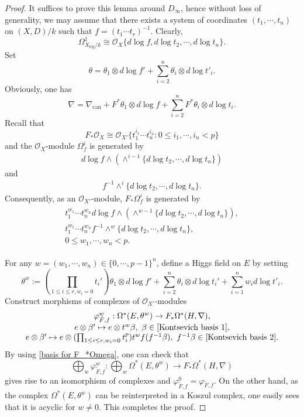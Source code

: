 \documentclass[12pt, a4paper]{article}
\begin{document}
\begin{proof}
It suffices to prove this lemma around $D_\infty$, hence without loss of generality, we may assume that there exists a system of coordinates $(t_1,\cdots,t_n)$ on $(X,D)/k$ such that $f=(t_1\cdots t_r)^{-1}$. Clearly, 
$$\Omega^1_{X_{\log}/k}\cong\mathcal O_X\{d\log f,d\log t_2,\cdots,d\log t_n\}.$$
Set 
$$\theta=\theta_1\otimes d\log f'+\sum_{i=2}^n\theta_i\otimes d\log t'_i.$$
Obviously, one has
$$
\nabla=\nabla_\mathrm{can}+F^*\theta_1\otimes d\log f+\sum_{i=2}^nF^*\theta_i\otimes d\log t_i.
$$
Recall that
$$
F_*\mathcal O_X\cong\mathcal O_{X'}\{t^{i_1}_1\cdots t^{i_n}_n:0\leq i_1,\cdots,i_n<p\}
$$
and the $\mathcal O_X$-module $\Omega_f^i$ is generated by 
\begin{eqnarray}\label{Kontsevich basis 1}
d\log f\wedge(\wedge^{i-1}\{d\log t_2,\cdots,d\log t_n\})
\end{eqnarray}
and
\begin{eqnarray}\label{Kontsevich basis 2}
f^{-1}\wedge^i\{d\log t_2,\cdots,d\log t_n\}.
\end{eqnarray}
Consequently, as an $\mathcal O_{X'}$-module, $F_*\Omega^i_f$ is generated by 
\begin{eqnarray}\label{basis for F_*Omega}
\begin{array}{c}
t_1^{w_1}\cdots t_n^{w_n}d\log f\wedge(\wedge^{w-1}\{d\log t_2,\cdots,d\log t_n\}),\\
t_1^{w_1}\cdots t_n^{w_n}f^{-1}\wedge^w\{d\log t_2,\cdots,d\log t_n\},\\
0\leq w_1,\cdots,w_n<p.
\end{array}
\end{eqnarray}

For any $w=(w_1,\cdots,w_n)\in\{0,\cdots,p-1\}^n$,  define a Higgs field on $E$ by setting
 $$\theta^w:=(\prod_{1\leq i\leq r,w_i=0}t_i')\theta_1\otimes d\log f'+\sum_{i=2}^n\theta_i\otimes d\log t_i'+\sum_{i=1}^nw_id\log t'_i.$$
Construct morphisms of complexes of $\mathcal O_{X'}$-modules
$$
\begin{array}{c}
\varphi^w_{\tilde F,f}:\Omega^*(E,\theta^w)\to F_*\Omega^*(H,\nabla),\\
e\otimes\beta'\mapsto e\otimes t^w\beta,~\beta\in\eqref{Kontsevich basis 1},\\
e\otimes\beta'\mapsto e\otimes(\prod_{1\leq i\leq r,w_i=0}t_i^p)t^wf(f^{-1}\beta),~f^{-1}\beta\in\eqref{Kontsevich basis 2}.
\end{array}
$$
By using \eqref{basis for F_*Omega}, one can check that
$$
\bigoplus_w\varphi^w_{\tilde F,f}:\bigoplus_w\Omega^*(E,\theta^w)\to F_*\Omega^*(H,\nabla)
$$
gives rise to an isomorphism of complexes and $\varphi^0_{\tilde F,f}=\varphi_{\tilde F,f}$. On the other hand, as the complex $\Omega^*(E,\theta^w)$ can be reinterpreted in a Koszul complex, one easily sees that it  is acyclic for $w\neq0$. This completes the proof.
 \end{proof}
\end{document}
